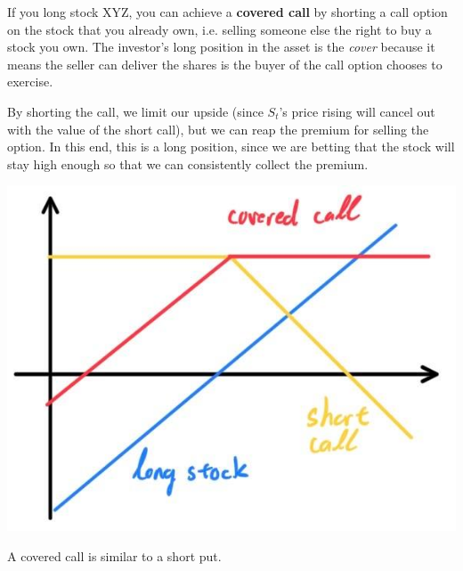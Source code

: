 \documentclass{article}
\begin{document}
\begin{definition}
If you long stock XYZ, you can achieve a \textbf{covered call} by shorting a call option on the stock that you already own, i.e. selling someone else the right to buy a stock you own. The investor's long position in the asset is the \textit{cover} because it means the seller can deliver the shares is the buyer of the call option chooses to exercise. 

By shorting the call, we limit our upside (since $S_t$'s price rising will cancel out with the value of the short call), but we can reap the premium for selling the option. In this end, this is a long position, since we are betting that the stock will stay high enough so that we can consistently collect the premium. 
\begin{center}
    \includegraphics[scale=0.3]{img/covered_call.jpg}
\end{center}
A covered call is similar to a short put. 
\end{definition}
\end{document}
